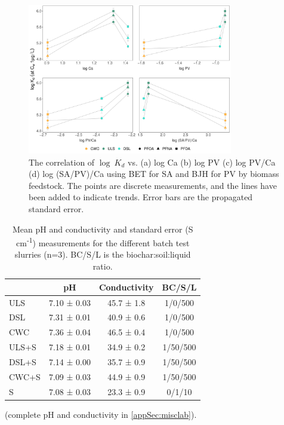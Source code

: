 \begin{figure}[htb]
    \centering
    \includegraphics[width=0.8\textwidth]{R/figs/Correlation_SAPV_Ca_plot.pdf}
    \caption{The correlation of $\log~K_d$ vs. (a) log Ca (b) log PV (c) log PV/Ca (d) log (SA/PV)/Ca using BET for SA and BJH for PV by biomass feedstock. The points are discrete measurements, and the lines have been added to indicate trends. Error bars are the propagated standard error.}
    \label{fig:Kd_SAPV_Ca}
\end{figure}

\begin{table}
\centering
\caption{Mean pH and conductivity and standard error (\textmu S cm\textsuperscript{-1}) measurements for the different batch test slurries (n=3). BC/S/L is the biochar:soil:liquid ratio.}
\label{tab:pHcond}
\begin{tabular}{lccc}
\toprule
 & \multicolumn{1}{c}{pH} & \multicolumn{1}{c}{Conductivity} & BC/S/L\\ \midrule
ULS   & 7.10 ± 0.03 & 45.7 ± 1.8 & 1/0/500\\
DSL   & 7.31 ± 0.01 & 40.9 ± 0.6 & 1/0/500\\
CWC   & 7.36 ± 0.04 & 46.5 ± 0.4 & 1/0/500\\
ULS+S & 7.18 ± 0.01 & 34.9 ± 0.2 & 1/50/500\\
DSL+S & 7.14 ± 0.00 & 35.7 ± 0.9 & 1/50/500\\
CWC+S & 7.09 ± 0.03 & 44.9 ± 0.9 & 1/50/500\\
S     & 7.08 ± 0.03 & 23.3 ± 0.9 & 0/1/10\\
\bottomrule
\end{tabular}
\end{table}

(complete pH and conductivity in \cref{appSec:misclab}).

